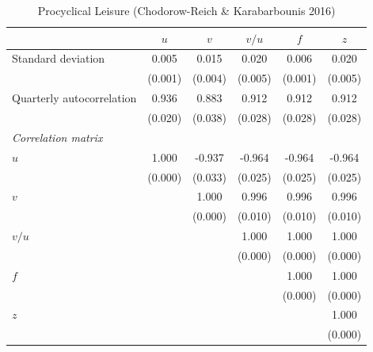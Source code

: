 \begin{table}[ht]
\centering
\caption{Procyclical Leisure (Chodorow-Reich \& Karabarbounis 2016)}
\label{tab:proc_leisure}
\begin{tabular}{lccccc}
\toprule
 & $u$ & $v$ & $v/u$ & $f$ & $z$ \\
\midrule
Standard deviation & 0.005 & 0.015 & 0.020 & 0.006 & 0.020 \\
 & (0.001) & (0.004) & (0.005) & (0.001) & (0.005) \\
\addlinespace
Quarterly autocorrelation & 0.936 & 0.883 & 0.912 & 0.912 & 0.912 \\
 & (0.020) & (0.038) & (0.028) & (0.028) & (0.028) \\
\midrule
\multicolumn{6}{l}{\textit{Correlation matrix}} \\
\addlinespace
$u$ & 1.000 & -0.937 & -0.964 & -0.964 & -0.964 \\
 & (0.000) & (0.033) & (0.025) & (0.025) & (0.025) \\
\addlinespace
$v$ &  & 1.000 & 0.996 & 0.996 & 0.996 \\
 &  & (0.000) & (0.010) & (0.010) & (0.010) \\
\addlinespace
$v/u$ &  &  & 1.000 & 1.000 & 1.000 \\
 &  &  & (0.000) & (0.000) & (0.000) \\
\addlinespace
$f$ &  &  &  & 1.000 & 1.000 \\
 &  &  &  & (0.000) & (0.000) \\
\addlinespace
$z$ &  &  &  &  & 1.000 \\
 &  &  &  &  & (0.000) \\
\bottomrule
\end{tabular}
\end{table}
